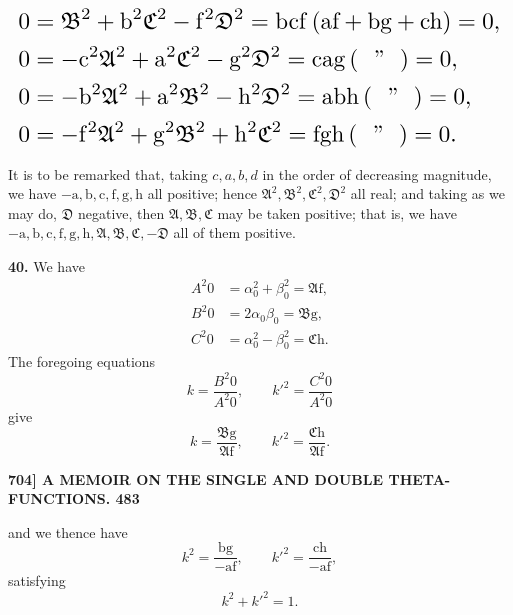 \documentclass[11pt]{article}
\newcommand{\Ag}{\mathfrak{A}}
\newcommand{\Bg}{\mathfrak{B}}
\newcommand{\Cg}{\mathfrak{C}}
\newcommand{\Dg}{\mathfrak{D}}
\begin{document}
\[
\resizebox{\textwidth}{!}{$\displaystyle
\begin{aligned}
0 &= \Bg^2 + \mathrm{b}^2\Cg^2 - \mathrm{f}^2\Dg^2 = \mathrm{b}\mathrm{c}\mathrm{f}\,(\mathrm{a}\mathrm{f}+\mathrm{b}\mathrm{g}+\mathrm{c}\mathrm{h}) = 0,\\
0 &= -\mathrm{c}^2\Ag^2 + \mathrm{a}^2\Cg^2 - \mathrm{g}^2\Dg^2 = \mathrm{c}\mathrm{a}\mathrm{g}\,(\ \ \mathrm{"}\ \ ) = 0,\\
0 &= -\mathrm{b}^2\Ag^2 + \mathrm{a}^2\Bg^2 - \mathrm{h}^2\Dg^2 = \mathrm{a}\mathrm{b}\mathrm{h}\,(\ \ \mathrm{"}\ \ ) = 0,\\
0 &= -\mathrm{f}^2\Ag^2 + \mathrm{g}^2\Bg^2 + \mathrm{h}^2\Cg^2 = \mathrm{f}\mathrm{g}\mathrm{h}\,(\ \ \mathrm{"}\ \ ) = 0.
\end{aligned}$}
\]

It is to be remarked that, taking $c,a,b,d$ in the order of decreasing magnitude, we have $-\mathrm{a},\mathrm{b},\mathrm{c},\mathrm{f},\mathrm{g},\mathrm{h}$ all positive; hence $\Ag^2,\Bg^2,\Cg^2,\Dg^2$ all real; and taking as we may do, $\Dg$ negative, then $\Ag,\Bg,\Cg$ may be taken positive; that is, we have $-\mathrm{a},\mathrm{b},\mathrm{c},\mathrm{f},\mathrm{g},\mathrm{h},\Ag,\Bg,\Cg,-\Dg$ all of them positive.

\medskip
\textbf{40.} We have
\[
\begin{aligned}
A^2 0 &= \alpha_0^2 + \beta_0^2 = \Ag\mathrm{f},\\
B^2 0 &= 2\alpha_0\beta_0 = \Bg\mathrm{g},\\
C^2 0 &= \alpha_0^2 - \beta_0^2 = \Cg\mathrm{h}.
\end{aligned}
\]
The foregoing equations
\[
k = \frac{B^2 0}{A^2 0},\qquad k'^2 = \frac{C^2 0}{A^2 0}
\]
give
\[
k = \frac{\Bg\mathrm{g}}{\Ag\mathrm{f}},\qquad k'^2 = \frac{\Cg\mathrm{h}}{\Ag\mathrm{f}}.
\]

\bigskip
\noindent\textbf{704] \hfill A MEMOIR ON THE SINGLE AND DOUBLE THETA-FUNCTIONS. \hfill 483}

\medskip
and we thence have
\[
k^2 = \frac{\mathrm{b}\mathrm{g}}{-\mathrm{a}\mathrm{f}},\qquad k'^2 = \frac{\mathrm{c}\mathrm{h}}{-\mathrm{a}\mathrm{f}},
\]
satisfying
\[
k^2 + k'^2 = 1.
\]
\end{document}
